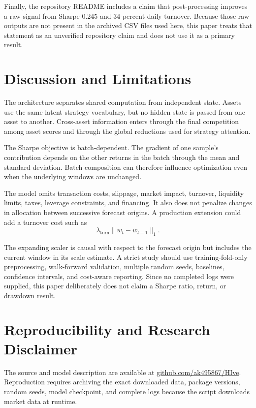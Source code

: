 \documentclass[10pt,a4paper,twocolumn]{article}
\begin{document}
Finally, the repository README includes a claim that post-processing improves a raw signal from Sharpe 0.245 and 34-percent daily turnover. Because those raw outputs are not present in the archived CSV files used here, this paper treats that statement as an unverified repository claim and does not use it as a primary result.

\section{Discussion and Limitations}

The architecture separates shared computation from independent state. Assets use the same latent strategy vocabulary, but no hidden state is passed from one asset to another. Cross-asset information enters through the final competition among asset scores and through the global reductions used for strategy attention.

The Sharpe objective is batch-dependent. The gradient of one sample's contribution depends on the other returns in the batch through the mean and standard deviation. Batch composition can therefore influence optimization even when the underlying windows are unchanged.

The model omits transaction costs, slippage, market impact, turnover, liquidity limits, taxes, leverage constraints, and financing. It also does not penalize changes in allocation between successive forecast origins. A production extension could add a turnover cost such as
\begin{equation}
\lambda_{\mathrm{turn}}\lVert w_t-w_{t-1}\rVert_1.
\end{equation}

The expanding scaler is causal with respect to the forecast origin but includes the current window in its scale estimate. A strict study should use training-fold-only preprocessing, walk-forward validation, multiple random seeds, baselines, confidence intervals, and cost-aware reporting. Since no completed logs were supplied, this paper deliberately does not claim a Sharpe ratio, return, or drawdown result.

\section{Reproducibility and Research Disclaimer}
The source and model description are available at \href{https://github.com/ak495867/HIve}{github.com/ak495867/HIve}. Reproduction requires archiving the exact downloaded data, package versions, random seeds, model checkpoint, and complete logs because the script downloads market data at runtime.
\end{document}
